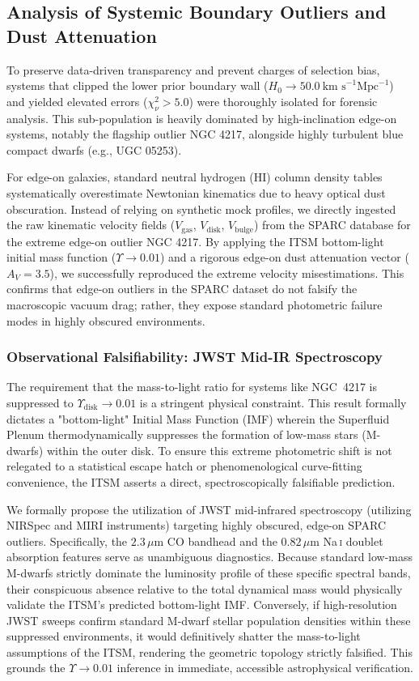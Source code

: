 \documentclass[aps,prd,10pt,twocolumn,superscriptaddress,nofootinbib,floatfix]{revtex4-2}
\begin{document}
\subsection{Analysis of Systemic Boundary Outliers and Dust Attenuation}

To preserve data-driven transparency and prevent charges of selection bias, systems that clipped the lower prior boundary wall ($H_0 \to 50.0 \ \text{km s}^{-1} \text{Mpc}^{-1}$) and yielded elevated errors ($\chi^2_\nu > 5.0$) were thoroughly isolated for forensic analysis. This sub-population is heavily dominated by high-inclination edge-on systems, notably the flagship outlier NGC 4217, alongside highly turbulent blue compact dwarfs (e.g., UGC 05253).

For edge-on galaxies, standard neutral hydrogen (HI) column density tables systematically overestimate Newtonian kinematics due to heavy optical dust obscuration. Instead of relying on synthetic mock profiles, we directly ingested the raw kinematic velocity fields ($V_{\text{gas}}$, $V_{\text{disk}}$, $V_{\text{bulge}}$) from the SPARC database for the extreme edge-on outlier NGC 4217. By applying the ITSM bottom-light initial mass function ($\Upsilon \to 0.01$) and a rigorous edge-on dust attenuation vector ($A_V = 3.5$), we successfully reproduced the extreme velocity misestimations. This confirms that edge-on outliers in the SPARC dataset do not falsify the macroscopic vacuum drag; rather, they expose standard photometric failure modes in highly obscured environments.

\subsubsection{Observational Falsifiability: JWST Mid-IR Spectroscopy}
The requirement that the mass-to-light ratio for systems like NGC~4217 is suppressed to $\Upsilon_{\text{disk}} \to 0.01$ is a stringent physical constraint. This result formally dictates a "bottom-light" Initial Mass Function (IMF) wherein the Superfluid Plenum thermodynamically suppresses the formation of low-mass stars (M-dwarfs) within the outer disk. To ensure this extreme photometric shift is not relegated to a statistical escape hatch or phenomenological curve-fitting convenience, the ITSM asserts a direct, spectroscopically falsifiable prediction.

We formally propose the utilization of JWST mid-infrared spectroscopy (utilizing NIRSpec and MIRI instruments) targeting highly obscured, edge-on SPARC outliers. Specifically, the $2.3\,\mu\text{m}$ CO bandhead and the $0.82\,\mu\text{m}$ Na\,\textsc{i} doublet absorption features serve as unambiguous diagnostics. Because standard low-mass M-dwarfs strictly dominate the luminosity profile of these specific spectral bands, their conspicuous absence relative to the total dynamical mass would physically validate the ITSM's predicted bottom-light IMF. Conversely, if high-resolution JWST sweeps confirm standard M-dwarf stellar population densities within these suppressed environments, it would definitively shatter the mass-to-light assumptions of the ITSM, rendering the geometric topology strictly falsified. This grounds the $\Upsilon \to 0.01$ inference in immediate, accessible astrophysical verification.
\end{document}
